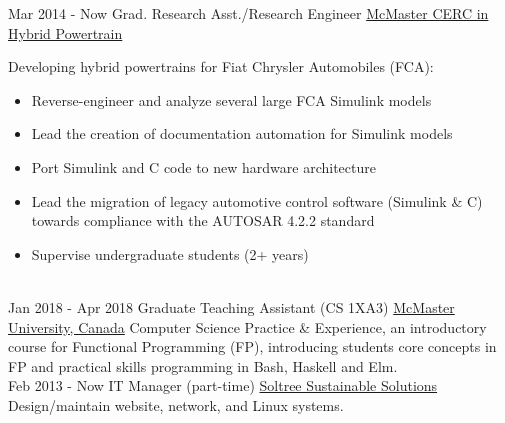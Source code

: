 \documentclass[letterpaper]{twentysecondcv} %
\begin{document}
\vspace{-.5em}
\begin{twenty} %
  \twentyitem
  {Mar 2014 -}
  {Now}
  {Grad. Research Asst./Research Engineer}
  {%
    \href{http://hybrid.mcmaster.ca/}{McMaster CERC in Hybrid Powertrain}}
  {}
  {Developing hybrid powertrains for Fiat Chrysler Automobiles (FCA):
    \begin{itemize}
      \item Reverse-engineer and analyze several large FCA Simulink models
      \item Lead the creation of documentation automation for Simulink models
      \item Port Simulink and C code to new hardware architecture
      \item Lead the migration of legacy automotive control software (Simulink \& C) towards compliance with the AUTOSAR 4.2.2 standard
      \item Supervise undergraduate students (2+ years)
    \end{itemize}}
	\\
  \twentyitem
  {Jan 2018 -}
  {Apr 2018}
  {Graduate Teaching Assistant (CS 1XA3)}
  {\href{https://www.mcmaster.ca/}{McMaster University, Canada}}
  {}
  {Computer Science Practice \& Experience, an introductory course for Functional Programming (FP), introducing students core concepts in FP and practical skills programming in Bash, Haskell and Elm.
}
	\\
	\twentyitem
	{Feb 2013 -}
	{Now}
	{IT Manager (part-time)}
	{\href{http://www.soltree.net/}{Soltree Sustainable Solutions}}
	{}
  {Design/maintain website, network, and Linux systems.}
\end{twenty}
\end{document}
